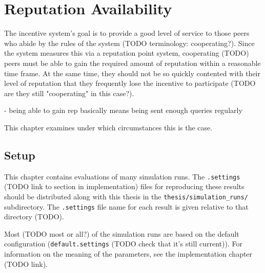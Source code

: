 \chapter{Reputation Availability}
The incentive system's goal is to provide a good level of service to those peers
who abide by the rules of the system (TODO terminology: cooperating?). Since the
system measures this via a reputation point system, cooperating (TODO) peers
must be able to gain the required amount of reputation within a reasonable time
frame. At the same time, they should not be so quickly contented with their
level of reputation that they frequently lose the incentive to participate (TODO
are they still "cooperating" in this case?).

- being able to gain rep basically means being sent enough queries regularly

This chapter examines under which circumstances this is the case.

\section{Setup}
This chapter contains evaluations of many simulation runs. The
\texttt{.settings} (TODO link to section in implementation) files for
reproducing these results should be distributed along with this thesis in the
\texttt{thesis/simulation\_runs/} subdirectory. The \texttt{.settings} file name
for each result is given relative to that directory (TODO).

Most (TODO most or all?) of the simulation runs are based on the default
configuration (\texttt{default.settings} (TODO check that it's still current)).
For information on the meaning of the parameters, see the implementation chapter
(TODO link).

